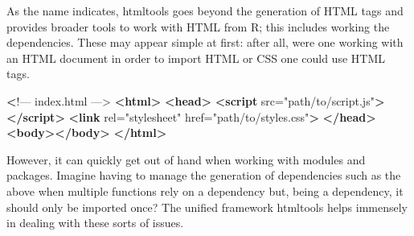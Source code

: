 \documentclass[
]{krantz}
\makeatletter
\newenvironment{Shaded}{\begin{snugshade}}{\end{snugshade}}
\newcommand{\ControlFlowTok}[1]{\textcolor[rgb]{0.27,0.27,0.27}{\textbf{#1}}}
\newcommand{\DataTypeTok}[1]{\textcolor[rgb]{0.27,0.27,0.27}{#1}}
\newcommand{\ErrorTok}[1]{\textcolor[rgb]{0.14,0.14,0.14}{\textbf{#1}}}
\newcommand{\KeywordTok}[1]{\textcolor[rgb]{0.27,0.27,0.27}{\textbf{#1}}}
\newcommand{\NormalTok}[1]{#1}
\newcommand{\OperatorTok}[1]{\textcolor[rgb]{0.43,0.43,0.43}{\textbf{#1}}}
\newcommand{\OtherTok}[1]{\textcolor[rgb]{0.37,0.37,0.37}{#1}}
\newcommand{\StringTok}[1]{\textcolor[rgb]{0.5,0.5,0.5}{#1}}
\newenvironment{kframe}{%
\medskip{}
\setlength{\fboxsep}{.8em}
 \def\at@end@of@kframe{}%
 \ifinner\ifhmode%
  \def\at@end@of@kframe{\end{minipage}}%
  \begin{minipage}{\columnwidth}%
 \fi\fi%
 \def\FrameCommand##1{\hskip\@totalleftmargin \hskip-\fboxsep
 \colorbox{shadecolor}{##1}\hskip-\fboxsep
     \hskip-\linewidth \hskip-\@totalleftmargin \hskip\columnwidth}%
 \MakeFramed {\advance\hsize-\width
   \@totalleftmargin\z@ \linewidth\hsize
   \@setminipage}}%
 {\par\unskip\endMakeFramed%
 \at@end@of@kframe}
\renewenvironment{Shaded}{\begin{kframe}}{\end{kframe}}
\makeatother
\begin{document}
\begin{Shaded}
\end{Shaded}

As the name indicates, htmltools goes beyond the generation of HTML tags and provides broader tools to work with HTML from R; this includes working the dependencies. These may appear simple at first: after all, were one working with an HTML document in order to import HTML or CSS one could use HTML tags.

\begin{Shaded}
\begin{Highlighting}[]
 \ErrorTok{<}\NormalTok{!–– index.html ––>}
\KeywordTok{<html>}
  \KeywordTok{<head>}
    \KeywordTok{<script}\OtherTok{ src=}\StringTok{"path/to/script.js"}\KeywordTok{></script>}
    \KeywordTok{<link}\OtherTok{ rel=}\StringTok{"stylesheet"}\OtherTok{ href=}\StringTok{"path/to/styles.css"}\KeywordTok{>}
  \KeywordTok{</head>}
  \KeywordTok{<body></body>}
\KeywordTok{</html>}
\end{Highlighting}
\end{Shaded}

However, it can quickly get out of hand when working with modules and packages. Imagine having to manage the generation of dependencies such as the above when multiple functions rely on a dependency but, being a dependency, it should only be imported once? The unified framework htmltools helps immensely in dealing with these sorts of issues.
\end{document}
